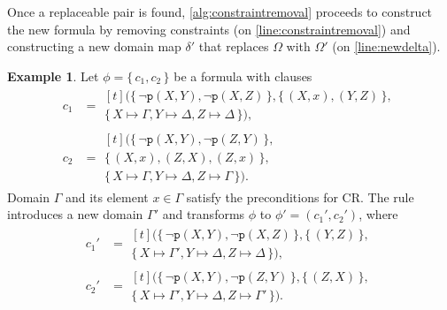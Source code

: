 \documentclass{article}
\theoremstyle{definition}
\newtheorem{example}{Example}
\begin{document}
Once a replaceable pair is found, \cref{alg:constraintremoval} proceeds to
construct the new formula by removing constraints (on
\cref{line:constraintremoval}) and constructing a new domain map $\delta'$ that
replaces $\Omega$ with $\Omega'$ (on \cref{line:newdelta}).

\begin{example}
  Let $\phi = \{\, c_1, c_2 \,\}$ be a formula with clauses
  \begin{align*}
    c_1 &=
          \begin{multlined}[t]
            (\{\, \neg \texttt{p}(X, Y), \neg \texttt{p}(X, Z) \,\}, \{\, (X, x), (Y, Z) \,\}, \\
            \{\, X \mapsto \Gamma, Y \mapsto \Delta, Z \mapsto \Delta \,\}),
          \end{multlined}\\
    c_2 &=
          \begin{multlined}[t]
            (\{\, \neg \texttt{p}(X, Y), \neg \texttt{p}(Z, Y) \,\}, \\
            \{\, (X, x), (Z, X), (Z, x) \,\}, \\
            \{\, X \mapsto \Gamma, Y \mapsto \Delta, Z \mapsto \Gamma \,\}).
          \end{multlined}
  \end{align*}
  Domain $\Gamma$ and its element $x \in \Gamma$ satisfy the preconditions for
  CR\@. The rule introduces a new domain $\Gamma'$ and transforms $\phi$ to
  $\phi' = (c_1', c_2')$, where
  \begin{align*}
    c_1' &=
           \begin{multlined}[t]
             (\{\, \neg \texttt{p}(X, Y), \neg \texttt{p}(X, Z) \,\}, \{\, (Y, Z) \,\}, \\
             \{\, X \mapsto \Gamma', Y \mapsto \Delta, Z \mapsto \Delta \,\}),
           \end{multlined} \\
    c_2' &=
           \begin{multlined}[t]
             (\{\, \neg \texttt{p}(X, Y), \neg \texttt{p}(Z, Y) \,\}, \{\, (Z, X) \,\}, \\
             \{\, X \mapsto \Gamma', Y \mapsto \Delta, Z \mapsto \Gamma' \,\}).
           \end{multlined}
  \end{align*}
\end{example}
\end{document}
